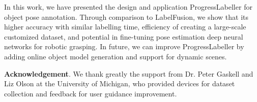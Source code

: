 In this work, we have presented the design and application ProgressLabeller for object pose annotation. Through comparison to LabelFusion, we show that its higher accuracy with similar labelling time, efficiency of creating a large-scale customized dataset, and potential in fine-tuning pose estimation deep neural networks for robotic grasping. In future, we can improve ProgressLabeller by adding online object model generation and support for dynamic scenes.

\noindent
\textbf{Acknowledgement}. We thank greatly the support from Dr. Peter Gaskell and Liz Olson at the University of Michigan, who provided devices for dataset collection and feedback for user guidance improvement.